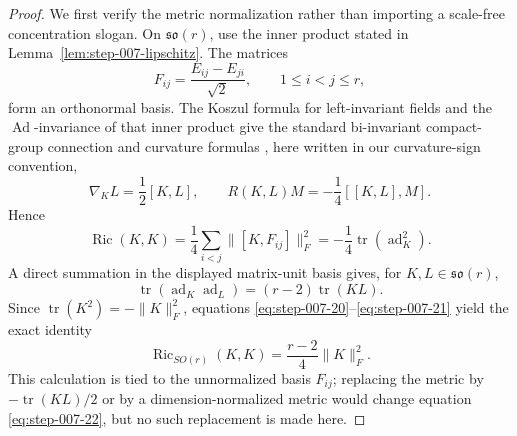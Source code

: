 \begin{proof}
We first verify the metric normalization rather
than importing a scale-free concentration slogan. On
\(\mathfrak{so}(r)\), use the inner product stated in
Lemma~\ref{lem:step-007-lipschitz}. The matrices
\[
  F_{ij}=\frac{E_{ij}-E_{ji}}{\sqrt2},
  \qquad 1\le i<j\le r,
\]
form an orthonormal basis. The Koszul formula for left-invariant fields and
the \(\operatorname{Ad}\)-invariance of that inner product give the standard
bi-invariant compact-group connection and curvature formulas
\citep[Chapter~7]{besse1987}, here written in our curvature-sign convention,
\begin{equation}
  \nabla_KL=\frac12[K,L],
  \qquad
  R(K,L)M=-\frac14[[K,L],M].                                \label{eq:step-007-19}
\end{equation}
Hence
\begin{equation}
  \operatorname{Ric}(K,K)
  =\frac14\sum_{i<j}\|[K,F_{ij}]\|_F^2
  =-\frac14\operatorname{tr}(\operatorname{ad}_K^2).       \label{eq:step-007-20}
\end{equation}
A direct summation in the displayed matrix-unit basis gives, for
\(K,L\in\mathfrak{so}(r)\),
\begin{equation}
  \operatorname{tr}(\operatorname{ad}_K\operatorname{ad}_L)
  =(r-2)\operatorname{tr}(KL).                              \label{eq:step-007-21}
\end{equation}
Since \(\operatorname{tr}(K^2)=-\|K\|_F^2\), equations
\eqref{eq:step-007-20}--\eqref{eq:step-007-21} yield the exact identity
\begin{equation}
  \operatorname{Ric}_{SO(r)}(K,K)
  =\frac{r-2}{4}\|K\|_F^2.                                 \label{eq:step-007-22}
\end{equation}
This calculation is tied to the unnormalized basis \(F_{ij}\); replacing
the metric by \(-\operatorname{tr}(KL)/2\) or by a dimension-normalized
metric would change equation \eqref{eq:step-007-22}, but no such replacement is made here.


\end{proof}
